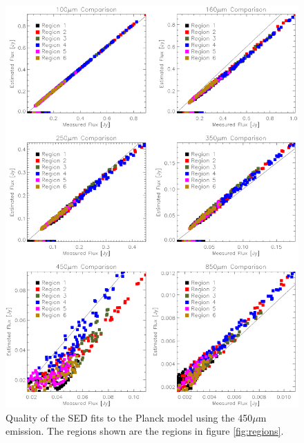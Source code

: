 \begin{figure}
  \centering
  \includegraphics[width=1.\textwidth]{sed_imgs/flux_compare_1_4.eps}
  \caption[Planck Model SED Fit Quality Using 450$\mu$m Data]{Quality of the SED fits to the Planck model using the 450$\mu$m emission.  The regions shown are the regions in figure \ref{fig:regions}.}
  \label{fig:w1_4}
\end{figure}

